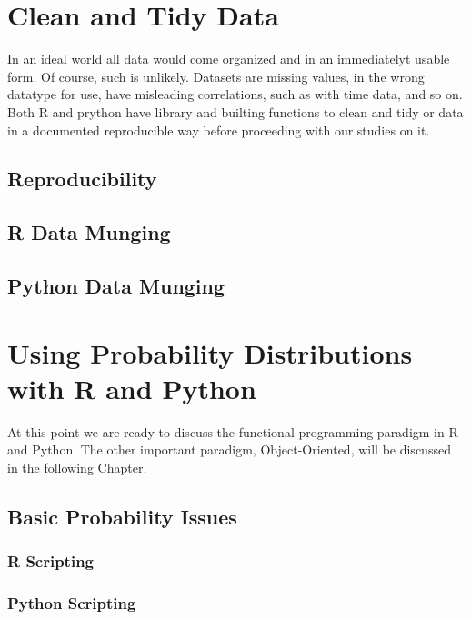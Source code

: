 \documentclass[]{book}
\theoremstyle{definition}
\theoremstyle{definition}
\theoremstyle{definition}
\theoremstyle{remark}
\begin{document}
\chapter{Clean and Tidy Data}\label{clean-and-tidy-data}

In an ideal world all data would come organized and in an immediatelyt
usable form. Of course, such is unlikely. Datasets are missing values,
in the wrong datatype for use, have misleading correlations, such as
with time data, and so on. Both R and prython have library and builting
functions to clean and tidy or data in a documented reproducible way
before proceeding with our studies on it.

\section{Reproducibility}\label{reproducibility}

\section{R Data Munging}\label{r-data-munging}

\section{Python Data Munging}\label{python-data-munging}

\chapter{Using Probability Distributions with R and
Python}\label{using-probability-distributions-with-r-and-python}

At this point we are ready to discuss the functional programming
paradigm in R and Python. The other important paradigm, Object-Oriented,
will be discussed in the following Chapter.

\section{Basic Probability Issues}\label{basic-probability-issues}

\subsection{R Scripting}\label{r-scripting-6}

\subsection{Python Scripting}\label{python-scripting-6}
\end{document}
